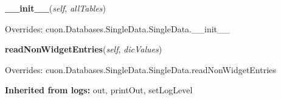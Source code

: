     \begin{boxedminipage}{\textwidth}

    \raggedright \textbf{\_\_init\_\_}(\textit{self}, \textit{allTables})

      Overrides: cuon.Databases.SingleData.SingleData.\_\_init\_\_

    \end{boxedminipage}

    \label{cuon:Web2:SingleWeb2:SingleWeb2:readNonWidgetEntries}
    \vspace{0.5ex}

    \begin{boxedminipage}{\textwidth}

    \raggedright \textbf{readNonWidgetEntries}(\textit{self}, \textit{dicValues})

      Overrides: cuon.Databases.SingleData.SingleData.readNonWidgetEntries

    \end{boxedminipage}

  \textbf{Inherited from logs:}
    out,
    printOut,
    setLogLevel
